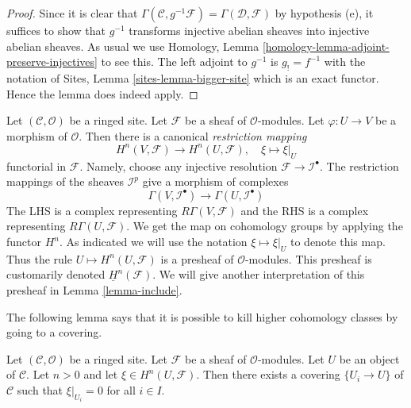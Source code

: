 \begin{proof}
Since it is clear that
$\Gamma(\mathcal{C}, g^{-1}\mathcal{F}) = \Gamma(\mathcal{D}, \mathcal{F})$
by hypothesis (e), it suffices to show that $g^{-1}$ transforms injective
abelian sheaves into injective abelian sheaves. As usual we use
Homology, Lemma \ref{homology-lemma-adjoint-preserve-injectives}
to see this. The left adjoint to $g^{-1}$ is $g_! = f^{-1}$ with the
notation of
Sites, Lemma \ref{sites-lemma-bigger-site}
which is an exact functor. Hence the lemma does indeed apply.
\end{proof}

\noindent
Let $(\mathcal{C}, \mathcal{O})$ be a ringed site.
Let $\mathcal{F}$ be a sheaf of $\mathcal{O}$-modules.
Let $\varphi : U \to V$ be a morphism of $\mathcal{O}$.
Then there is a canonical {\it restriction mapping}
\begin{equation}
\label{equation-restriction-mapping}
H^n(V, \mathcal{F})
\longrightarrow
H^n(U, \mathcal{F}), \quad
\xi \longmapsto \xi|_U
\end{equation}
functorial in $\mathcal{F}$. Namely, choose any injective
resolution $\mathcal{F} \to \mathcal{I}^\bullet$. The restriction
mappings of the sheaves $\mathcal{I}^p$ give a morphism of complexes
$$
\Gamma(V, \mathcal{I}^\bullet)
\longrightarrow
\Gamma(U, \mathcal{I}^\bullet)
$$
The LHS is a complex representing $R\Gamma(V, \mathcal{F})$
and the RHS is a complex representing $R\Gamma(U, \mathcal{F})$.
We get the map on cohomology groups by applying the functor $H^n$.
As indicated we will use the notation $\xi \mapsto \xi|_U$ to denote this map.
Thus the rule $U \mapsto H^n(U, \mathcal{F})$ is a presheaf of
$\mathcal{O}$-modules. This presheaf is customarily denoted
$\underline{H}^n(\mathcal{F})$. We will give another interpretation
of this presheaf in Lemma \ref{lemma-include}.

\medskip\noindent
The following lemma says that it is possible to kill higher cohomology
classes by going to a covering.

\begin{lemma}
\label{lemma-kill-cohomology-class-on-covering}
Let $(\mathcal{C}, \mathcal{O})$ be a ringed site.
Let $\mathcal{F}$ be a sheaf of $\mathcal{O}$-modules.
Let $U$ be an object of $\mathcal{C}$.
Let $n > 0$ and let $\xi \in H^n(U, \mathcal{F})$.
Then there exists a covering $\{U_i \to U\}$ of $\mathcal{C}$
such that $\xi|_{U_i} = 0$ for all $i \in I$.
\end{lemma}

